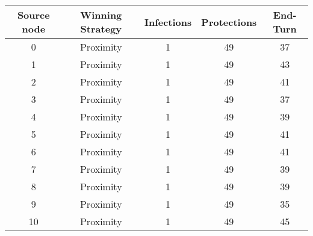 \documentclass[results.tex]{subfiles}
\begin{document}
    \begin{center}
        \begin{tabular}{| c || c | c | c | c |}
            \hline
            {\bfseries Source node} & {\bfseries Winning Strategy} & {\bfseries Infections} & {\bfseries Protections}
            & {\bfseries End-Turn}
            \\  %
            \hline\hline
            0                       & Proximity                    & 1                      & 49                      & 37                   \\
            \hline
            1                       & Proximity                    & 1                      & 49                      & 43                   \\
            \hline
            2                       & Proximity                    & 1                      & 49                      & 41                   \\
            \hline
            3                       & Proximity                    & 1                      & 49                      & 37                   \\
            \hline
            4                       & Proximity                    & 1                      & 49                      & 39                   \\
            \hline
            5                       & Proximity                    & 1                      & 49                      & 41                   \\
            \hline
            6                       & Proximity                    & 1                      & 49                      & 41                   \\
            \hline
            7                       & Proximity                    & 1                      & 49                      & 39                   \\
            \hline
            8                       & Proximity                    & 1                      & 49                      & 39                   \\
            \hline
            9                       & Proximity                    & 1                      & 49                      & 35                   \\
            \hline
            10                      & Proximity                    & 1                      & 49                      & 45                   \\

\end{tabular}
\end{center}
\end{document}
